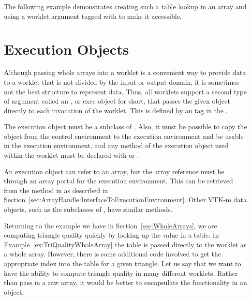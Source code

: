The following example demonstrates creating such a table lookup in an array
and using a worklet argument tagged with  to make it
accessible.




\section{Execution Objects}
\label{sec:ExecutionObjects}


Although passing whole arrays into a worklet is a convenient way to provide
data to a worklet that is not divided by the input or output domain, it is
sometimes not the best structure to represent data. Thus, all worklets
support a second type of argument called an , or
exec object for short, that passes the given object directly to each
invocation of the worklet. This is defined by an  tag in
the \controlsignature.

The execution object must be a subclass of .
Also, it must be possible to copy the object from the control environment
to the execution environment and be usable in the execution environment,
and any method of the execution object used within the worklet must be
declared with \vtkmexecexport or \vtkmexeccontexport.

An execution object can refer to an array, but the array reference must be
through an array portal for the execution environment. This can be
retrieved from the  method in
 as described in
Section~\ref{sec:ArrayHandle:InterfaceToExecutionEnvironment}. Other VTK-m
data objects, such as the subclasses of , have similar
methods.

Returning to the example we have in Section~\ref{sec:WholeArrays}, we are
computing triangle quality quickly by looking up the value in a table. In
Example~\ref{ex:TriQualityWholeArray} the table is passed directly to the
worklet as a whole array. However, there is some additional code involved
to get the appropriate index into the table for a given triangle. Let us
say that we want to have the ability to compute triangle quality in many
different worklets. Rather than pass in a raw array, it would be better to
encapsulate the functionality in an object.


